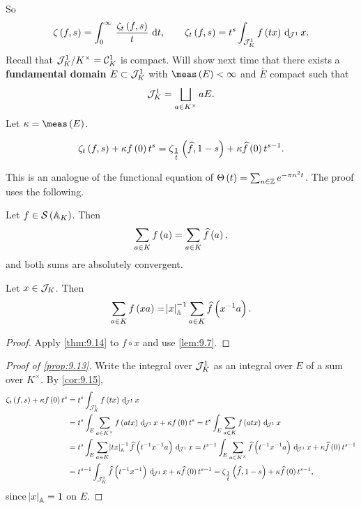 So
$$ \zeta\br{f, s} = \intd{0}{\infty}{\dfrac{\zeta_t\br{f, s}}{t}}{t}, \qquad \zeta_t\br{f, s} = t^s\intJI{f\br{tx}}{x}. $$
Recall that $ \mathcal{J}_K^1 / K^\times = \mathcal{C}_K^1 $ is compact. Will show next time that there exists a \textbf{fundamental domain} $ E \subset \mathcal{J}_K^1 $ with $ \meas\br{E} < \infty $ and $ \overline{E} $ compact such that
$$ \mathcal{J}_K^1 = \bigsqcup_{a \in K^\times} aE. $$
Let $ \kappa = \meas\br{E} $.

\begin{proposition}
\label{prop:9.13}
$$ \zeta_t\br{f, s} + \kappa f\br{0}t^s = \zeta_{\tfrac{1}{t}}\br{\widehat{f}, 1 - s} + \kappa\widehat{f}\br{0}t^{s - 1}. $$
\end{proposition}

This is an analogue of the functional equation of $ \Theta\br{t} = \sum_{n \in \ZZ} e^{-\pi n^2t} $. The proof uses the following.

\begin{theorem}
\label{thm:9.14}
Let $ f \in \SSS\br{\AA_K} $. Then
$$ \sum_{a \in K} f\br{a} = \sum_{a \in K} \widehat{f}\br{a}, $$
and both sums are absolutely convergent.
\end{theorem}

\begin{corollary}
\label{cor:9.15}
Let $ x \in \mathcal{J}_K $. Then
$$ \sum_{a \in K} f\br{xa} = \abs{x}_\AA^{-1}\sum_{a \in K} \widehat{f}\br{x^{-1}a}. $$
\end{corollary}

\begin{proof}
Apply \ref{thm:9.14} to $ f \circ x $ and use \ref{lem:9.7}.
\end{proof}

\pagebreak

\begin{proof}[Proof of \ref{prop:9.13}]
Write the integral over $ \mathcal{J}_K^1 $ as an integral over $ E $ of a sum over $ K^\times $. By \ref{cor:9.15},
\begin{align*}
\zeta_t\br{f, s} + \kappa f\br{0}t^s
& = t^s\intJI{f\br{tx}}{x} \\
& = t^s\intJI[E]{\sum_{a \in K^\times} f\br{atx}}{x} + \kappa f\br{0}t^s
= t^s\intJI[E]{\sum_{a \in K} f\br{atx}}{x} \\
& = t^s\intJI[E]{\sum_{a \in K} \abs{tx}_\AA^{-1}\widehat{f}\br{t^{-1}x^{-1}a}}{x}
= t^{s - 1}\intJI[E]{\sum_{a \in K^\times} \widehat{f}\br{t^{-1}x^{-1}a}}{x} + \kappa\widehat{f}\br{0}t^{s - 1} \\
& = t^{s - 1}\intJI{\widehat{f}\br{t^{-1}x^{-1}}}{x} + \kappa\widehat{f}\br{0}t^{s - 1}
= \zeta_{\tfrac{1}{t}}\br{\widehat{f}, 1 - s} + \kappa\widehat{f}\br{0}t^{s - 1},
\end{align*}
since $ \abs{x}_{\mathbb{A}} = 1 $ on $ E $.
\end{proof}

